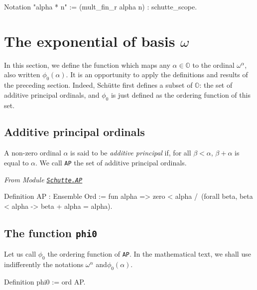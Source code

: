 {\begin{Coqsrc}
Notation "alpha * n" := (mult_fin_r alpha n) : schutte_scope.
\end{Coqsrc}

\section{The exponential of basis \texorpdfstring{$\omega$}{omega}}

In this section, we define the function which maps any $\alpha\in\mathbb{O}$ to
the ordinal  $\omega^\alpha$, also written 
$\phi_0(\alpha)$. 
It is an opportunity to apply the definitions and results of the preceding section. 
Indeed,  Schütte first defines a subset of $\mathbb{O}$: the set of additive principal ordinals, and $\phi_0$  is just defined as the ordering function of this set.

\subsection{Additive principal ordinals}


\begin{definition}
A non-zero ordinal  $\alpha$ is said to be \emph{additive principal} if, for all  $\beta<\alpha$, $\beta+\alpha$ is equal to  $\alpha$.
We call \texttt{AP} the set of additive principal ordinals.

\end{definition}



\noindent\emph{From Module \href{../theories/html/hydras.Schutte.AP.html}%
{\texttt{Schutte.AP}}}

\begin{Coqsrc}
Definition AP : Ensemble Ord :=
  fun alpha => 
  zero < alpha /\
  (forall beta, beta < alpha ->  beta + alpha = alpha).
\end{Coqsrc}

\subsection{The function \texttt{phi0}}

Let us call  $\phi_0$ the ordering function of \texttt{AP}.
In the mathematical text, we shall use indifferently the notations  $\omega^\alpha$ and$\phi_0(\alpha)$. 

\begin{Coqsrc}
Definition phi0 := ord AP.


\end{Coqsrc}}
